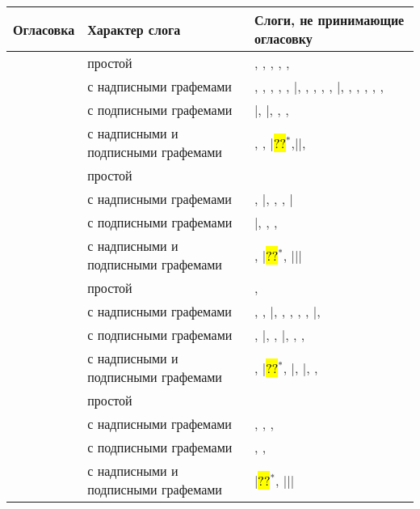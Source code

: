 \begin{tabularx}{\textwidth}{|L{3}|L{10}|L{17}|}
	\caption{Слоги, не принимающие огласовку}
	\label{tab:2}\\
		\hline
	Огла\-совка & Характер слога & Слоги, не принимающие огласовку\\
	\hline
	\rule{0cm}{5mm}
	 & простой & , , , , , \\
	& с надписными графемами & , , , , , |\quad  {}, , , , , |\quad {}, , , , , , \\
	\rule{0cm}{5mm}
	& с подписными графемами & |\quad {}, |\quad {}, , , \\
	\rule{0cm}{5mm}
	& с надписными и подписными графемами & , , |\quad \hl{??}\hyperref[tab:2:spec1]{$^*$},|\quad {}|\quad {},\\ 
	\hline
	\rule{0cm}{5mm}
	 & простой & \\
	& с надписными графемами & , |\quad {}, , , |\quad {}\\
	\rule{0cm}{5mm}
	& с подписными графемами & |\quad {}, , , \\
	\rule{0cm}{5mm}
	& с надписными и подписными графемами & , |\quad \hl{??}\hyperref[tab:2:spec1]{$^*$}, |\quad {}|\quad {}|\quad {}\\
	\hline
	\rule{0cm}{5mm}
	 & простой & , \\
	& с надписными графемами & , , |\quad {}, , , , , |\quad {}, \\
	\rule{0cm}{5mm}
	& с подписными графемами & , |\quad {}, , |\quad {}, , , \\
	\rule{0cm}{5mm}
	& с надписными и подписными графемами & , |\quad \hl{??}\hyperref[tab:2:spec1]{$^*$}, |\quad {}, |\quad {}, , \\
	\hline
	\rule{0cm}{5mm}
	 & простой & \\
	& с надписными графемами & , , , \\
	\rule{0cm}{5mm}
	& с подписными графемами & , , \\
	\rule{0cm}{5mm}
	& с надписными и подписными графемами & |\quad \hl{??}\hyperref[tab:2:spec1]{$^*$}, |\quad {}|\quad {}|\quad {}\\
	\hline
\end{tabularx}
